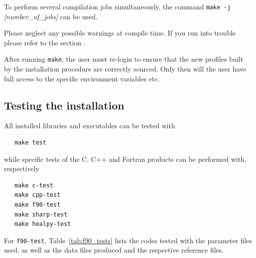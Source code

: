 \documentclass[12pt,twoside]{article}
\begin{document}
To perform several compilation jobs simultaneously, the command \texttt{make -j }\textit{[number\_of\_jobs]}
can be used.

Please neglect any possible warnings at compile time. If you run into
trouble please refer to the section .

After running \texttt{make}, the user must re-login to ensure that the new profiles built by the installation
procedure are correctly sourced. Only then will the
user have full access to the specific \healpix
environment variables etc.

\subsection{Testing the installation}

All installed libraries and executables can be tested with 
\begin{verbatim}
   make test
\end{verbatim}

while specific tests of the C, C++ and Fortran products can be performed with,
respectively
\begin{verbatim}
   make c-test
   make cpp-test
   make f90-test
   make sharp-test
   make healpy-test
\end{verbatim}
For \texttt{f90-test}, Table~\ref{tab:f90_tests} lists the codes tested with the
parameter files used, as well as the data files produced and the respective
reference files.
\end{document}
